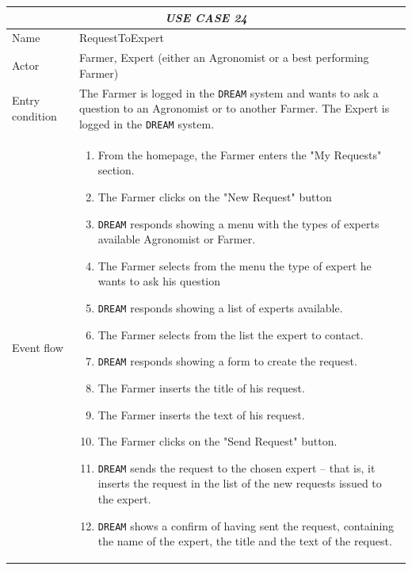 \documentclass{article}
\begin{document}
\centering
\begin{longtable}{|p{3.5cm}|m{8cm}|}
 \hline
 \multicolumn{2}{|c|}{\cellcolor{white}\emph{USE CASE 24}} \\
 \endfirsthead
 \endhead
 \endfoot
 \endlastfoot
 \hline
 Name & RequestToExpert\\
 \hline
 Actor & Farmer, Expert (either an Agronomist or a best performing Farmer)\\
 \hline
 Entry condition & The Farmer is logged in the \verb|DREAM| system and wants to ask a question to an Agronomist or to another Farmer.
The Expert is logged in the \verb|DREAM| system.\\
 \hline
 Event flow & \begin{enumerate}
    \item From the homepage, the Farmer enters the "My Requests" section.
    \item The Farmer clicks on the "New Request" button
    \item \verb|DREAM| responds showing a menu with the types of experts available
        Agronomist or Farmer.
    \item The Farmer selects from the menu the type of expert he wants to ask his
        question  
    \item \verb|DREAM| responds showing a list of experts available.
    \item The Farmer selects from the list the expert to contact.
    \item \verb|DREAM| responds showing a form to create the request.
    \item The Farmer inserts the title of his request.
    \item The Farmer inserts the text of his request.
    \item The Farmer clicks on the "Send Request" button.
    \item \verb|DREAM| sends the request to the chosen expert – that is, it inserts the request in the list of the new requests issued to the expert.
    \item \verb|DREAM| shows a confirm of having sent the request, containing the name of the expert, the title and the text of the request.
    

\end{enumerate}
\end{longtable}
\end{document}
